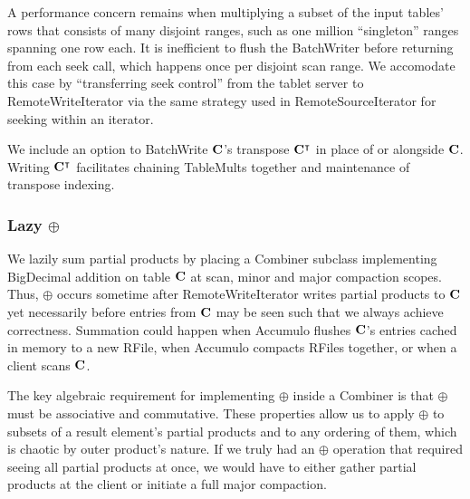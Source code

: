 A performance concern remains when multiplying a subset of the input tables' rows 
that consists of many disjoint ranges, such as one million ``singleton'' ranges spanning one row each.
It is inefficient to flush the BatchWriter before returning from each seek call, which happens once per 
disjoint scan range. %
We accomodate this case by ``transferring seek control'' %
from the tablet server to RemoteWriteIterator 
via the same strategy used in RemoteSourceIterator for seeking within an iterator.

We include an option to BatchWrite $\mathbf{C}$'s transpose $\mathbf{C^{\intercal}}$ in place of or alongside $\mathbf{C}$. 
Writing $\mathbf{C^{\intercal}}$ facilitates chaining TableMults together
and maintenance of transpose indexing.

\subsubsection{Lazy $\oplus$}
We lazily sum partial products by placing a Combiner subclass implementing BigDecimal addition 
on table $\mathbf{C}$ at scan, minor and major compaction scopes.
Thus, $\oplus$ occurs sometime after RemoteWriteIterator writes partial products to $\mathbf{C}$
yet necessarily before entries from $\mathbf{C}$ may be seen such that we always achieve correctness.
Summation could happen when Accumulo flushes $\mathbf{C}$'s entries cached in memory to a new RFile, 
when Accumulo compacts RFiles together, or when a client scans $\mathbf{C}$. 

The key algebraic requirement for implementing $\oplus$ inside a Combiner
is that $\oplus$ must be associative and commutative.
These properties allow us to apply $\oplus$ to subsets of a result element's partial products 
and to any ordering of them, which is chaotic by outer product's nature.
If we truly had an $\oplus$ operation that required seeing all partial products at once,
we would have to either gather partial products at the client or initiate a full major compaction.

